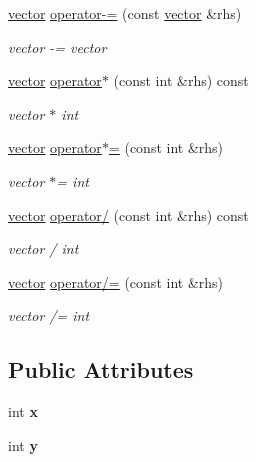 \begin{DoxyCompactItemize}
\hyperlink{classvector}{vector} \hyperlink{classvector_a3e73e3ef763da682e157866d641b9c33}{operator-\/=} (const \hyperlink{classvector}{vector} \&rhs)
\begin{DoxyCompactList}\small\item\em vector -\/= vector \end{DoxyCompactList}\item 
\hyperlink{classvector}{vector} \hyperlink{classvector_a7527f40d4c6ae9c31c29be5d5eef8464}{operator$\ast$} (const int \&rhs) const 
\begin{DoxyCompactList}\small\item\em vector $\ast$ int \end{DoxyCompactList}\item 
\hyperlink{classvector}{vector} \hyperlink{classvector_a7f243be4579f4fbcc3b7e4a251179832}{operator$\ast$=} (const int \&rhs)
\begin{DoxyCompactList}\small\item\em vector $\ast$= int \end{DoxyCompactList}\item 
\hyperlink{classvector}{vector} \hyperlink{classvector_acd71903ef3f8e6476ea27bef00099c11}{operator/} (const int \&rhs) const 
\begin{DoxyCompactList}\small\item\em vector / int \end{DoxyCompactList}\item 
\hyperlink{classvector}{vector} \hyperlink{classvector_aa32634e5c1a32e081d1a89a96720a96e}{operator/=} (const int \&rhs)
\begin{DoxyCompactList}\small\item\em vector /= int \end{DoxyCompactList}\end{DoxyCompactItemize}
\subsection*{Public Attributes}
\begin{DoxyCompactItemize}
\item 
int {\bfseries x}\hypertarget{classvector_a0403eb3aea23a3009e276fba1d317046}{}\label{classvector_a0403eb3aea23a3009e276fba1d317046}

\item 
int {\bfseries y}\hypertarget{classvector_aad6de640298eae97ca0a094db5aff477}{}\label{classvector_aad6de640298eae97ca0a094db5aff477}

\end{DoxyCompactItemize}
